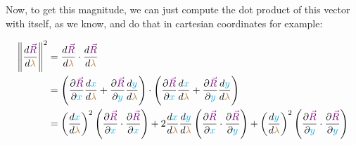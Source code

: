 Now, to get this magnitude, we can just compute the dot product of this vector with itself, as we know, and do that in cartesian coordinates for example:

\begin{align*}
    \norm{\frac{d\begingroup\color{violet}\vec{R}\endgroup}{d\begingroup\color{brown}\lambda\endgroup}}^2 &=
    \frac{d\begingroup\color{violet}\vec{R}\endgroup}{d\begingroup\color{brown}\lambda\endgroup} \cdot \frac{d\begingroup\color{violet}\vec{R}\endgroup}{d\begingroup\color{brown}\lambda\endgroup}\\
    &= \left(\frac{\partial \begingroup\color{violet}\vec{R}\endgroup}{\partial \begingroup\color{cyan}x\endgroup} \frac{d \begingroup\color{cyan}x\endgroup}{d \begingroup\color{brown}\lambda\endgroup} + 
    \frac{\partial \begingroup\color{violet}\vec{R}\endgroup}{\partial \begingroup\color{cyan}y\endgroup} \frac{d \begingroup\color{cyan}y\endgroup}{d \begingroup\color{brown}\lambda\endgroup}\right) \cdot
    \left(\frac{\partial \begingroup\color{violet}\vec{R}\endgroup}{\partial \begingroup\color{cyan}x\endgroup} \frac{d \begingroup\color{cyan}x\endgroup}{d \begingroup\color{brown}\lambda\endgroup} + 
    \frac{\partial \begingroup\color{violet}\vec{R}\endgroup}{\partial \begingroup\color{cyan}y\endgroup} \frac{d \begingroup\color{cyan}y\endgroup}{d \begingroup\color{brown}\lambda\endgroup}\right)\\
    &= \left(\frac{d \begingroup\color{cyan}x\endgroup}{d \begingroup\color{brown}\lambda\endgroup}\right)^2 \left(\frac{\partial \begingroup\color{violet}\vec{R}\endgroup}{\partial \begingroup\color{cyan}x\endgroup} \cdot \frac{\partial \begingroup\color{violet}\vec{R}\endgroup}{\partial \begingroup\color{cyan}x\endgroup}\right) +
    2 \frac{d \begingroup\color{cyan}x\endgroup}{d \begingroup\color{brown}\lambda\endgroup} \frac{d \begingroup\color{cyan}y\endgroup}{d \begingroup\color{brown}\lambda\endgroup} \left(\frac{\partial \begingroup\color{violet}\vec{R}\endgroup}{\partial \begingroup\color{cyan}x\endgroup} \cdot \frac{\partial \begingroup\color{violet}\vec{R}\endgroup}{\partial \begingroup\color{cyan}y\endgroup}\right) +
    \left(\frac{d \begingroup\color{cyan}y\endgroup}{d \begingroup\color{brown}\lambda\endgroup}\right)^2  \left(\frac{\partial \begingroup\color{violet}\vec{R}\endgroup}{\partial \begingroup\color{cyan}y\endgroup} \cdot \frac{\partial \begingroup\color{violet}\vec{R}\endgroup}{\partial \begingroup\color{cyan}y\endgroup}\right)
\end{align*}

